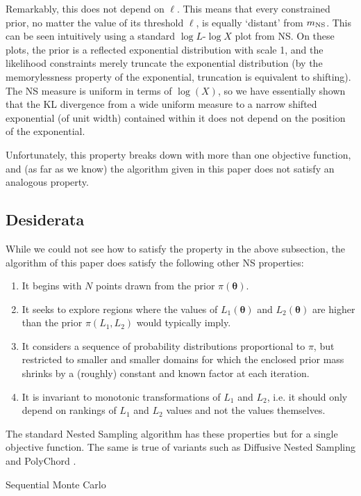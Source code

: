 \documentclass[entropy,article,submit,moreauthors,pdftex,10pt,a4paper]{Definitions/mdpi}
\newcommand{\xx}{\boldsymbol{\theta}}
\begin{document}
Remarkably, this does not depend on $\ell$. This means that every constrained
prior, no matter the value of its threshold $\ell$, is equally `distant'
from $m_{\rm NS}$. This can be seen intuitively using a standard
$\log L$-$\log X$ plot from NS. On these plots, the prior is a reflected
exponential distribution with scale 1, and the likelihood constraints
merely truncate the exponential distribution (by the memorylessness property
of the exponential, truncation is equivalent to shifting). The NS measure
is uniform in terms of $\log(X)$, so we have essentially shown that the KL
divergence from a wide uniform measure to a narrow shifted
exponential (of unit width) contained within it does not depend on the
position of the exponential.

Unfortunately, this property breaks down with more than
one objective function, and (as far as we know) the algorithm given in this
paper does not satisfy an analogous property.

\subsection{Desiderata}
While we could not see how to satisfy the property in the above subsection,
the algorithm of this paper does satisfy the following other NS properties:
\begin{enumerate}
\item It begins with $N$ points drawn from the prior $\pi(\xx)$.
\item It seeks to explore regions where the values of
$L_1(\xx)$ and $L_2(\xx)$ are higher than the prior $\pi(L_1, L_2)$
would typically imply.
\item It considers a sequence of probability
distributions proportional to $\pi$, but restricted to smaller and smaller
domains for which the enclosed prior mass shrinks by a (roughly) constant and
known factor at each iteration.
\item It is invariant to monotonic transformations of
$L_1$ and $L_2$, i.e. it should only depend on rankings of $L_1$ and $L_2$
values and not the values themselves.
\end{enumerate}
The standard Nested Sampling algorithm has these properties but for a
single objective function. The same is true of variants such as
Diffusive Nested Sampling \citep{dns, dnest4} and PolyChord
\citep{handley2015polychord}.

Sequential Monte Carlo \citep{doucet2001introduction, salomone2018unbiased}
\end{document}
